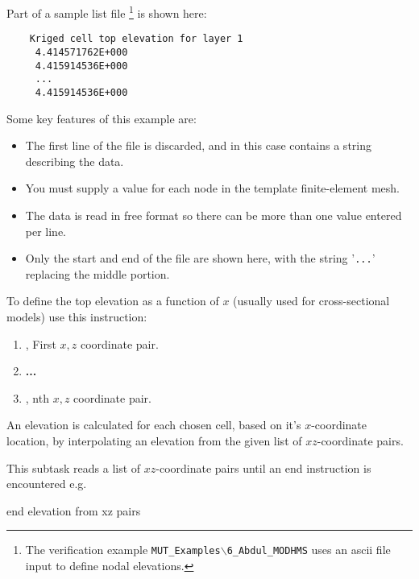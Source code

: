 Part of a sample list file \footnote{The verification example \texttt{MUT\_Examples$\backslash$6\_Abdul\_MODHMS} uses an ascii file input to define nodal elevations.} is shown here:
    \begin{verbatim}
    Kriged cell top elevation for layer 1
     4.414571762E+000
     4.415914536E+000
     ...
     4.415914536E+000
     \end{verbatim}
     \squish
Some key features of this example are:
\begin{itemize}
  \item The first line of the file is discarded, and in this case contains a string describing the data.
  \item You must supply a value for each node in the template finite-element mesh.
  \item The data is read in free format so there can be more than one value entered per line.
  \item Only the start and end of the file are shown here, with the string '\texttt{...}' replacing the middle portion.
\end{itemize}

To define the top elevation as a function of $x$ (usually used for cross-sectional models) use this instruction:

    {
    \squish
    \begin{enumerate}
    \item {},   First $x, z$ coordinate pair.
    \item \textbf{...}
    \item {},   nth $x, z$ coordinate pair.
    \end{enumerate}

     An elevation is calculated for each chosen cell, based on it's $x$-coordinate location, by interpolating an elevation from the given list of  $xz$-coordinate pairs.

     This subtask reads a list of $xz$-coordinate pairs until an \textsf{end} instruction is encountered e.g.\:

    {\Large \sf end elevation from xz pairs}
    }

